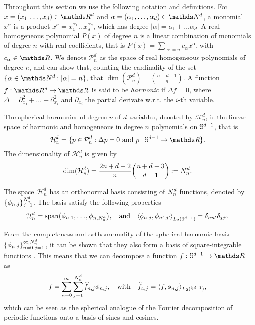 Throughout this section we use the following notation and definitions. For $x = (x_1, \ldots, x_d) \in \Reals^d$ and $\alpha = (\alpha_1, \ldots, \alpha_d) \in \Naturals^d$, a monomial $x^\alpha$ is a product $x^\alpha = x_1^{\alpha_1} \ldots x_d^{\alpha_d}$, which has degree $|\alpha| = \alpha_1 + \ldots \alpha_d$. A real homogeneous polynomial $P(x)$ of degree $n$ is a linear combination of monomials of degree $n$ with real coefficients, that is $P(x) = \sum_{|\alpha| = n} c_{\alpha} x^{\alpha}$, with $c_\alpha \in \Reals$. We denote $\mathcal{P}_n^d$ as the space of real homogeneous polynomials of degree $n$, and can show that, counting the cardinality of the set $\{\alpha \in \Naturals^d: |\alpha| = n\}$, that $\dim(\mathcal{P}_n^d) = \binom{n + d -1}{n}$. A function $f:\Reals^d \rightarrow \Reals$ is said to be \emph{harmonic} if $\Delta f = 0$, where $\Delta = \partial_{x_1}^2 + \ldots + \partial_{x_d}^2$ and $\partial_{x_i}$ the partial derivate w.r.t. the $i$-th variable.

\begin{definition}
    The spherical harmonics of degree $n$ of $d$ variables, denoted by $\mathcal{H}_{n}^d$, is the linear space of harmonic and homogeneous in degree $n$ polynomials on $\mathbb{S}^{d-1}$, that is 
    \begin{equation}
        \mathcal{H}_{n}^d = \{p \in \mathcal{P}_n^d: \Delta p = 0\ \text{and}\ p: \dsphere \rightarrow \Reals \}.
    \end{equation}
The dimensionality of $ \mathcal{H}_{n}^d$ is given by
\begin{equation}
\label{eq:numharmonics}
\textrm{dim}(\mathcal{H}_{n}^d) = \frac{2 n + d - 2}{n} \binom{n + d - 3}{d - 1} := N^d_n.
\end{equation}
\end{definition}

The space $\mathcal{H}_{n}^d$ has an orthonormal basis consisting of $N^d_n$ functions, denoted by $\{\phi_{n,j}\}_{j=1}^{N^d_n}$. The basis satisfy the following properties
\begin{equation}
    \mathcal{H}_{n}^d  = \textrm{span}\left(\phi_{n,1}, \ldots, \phi_{n, \dnumharmonicsforlevel}\right),\quad\text{and}\quad\left\langle \phi_{n, j}, \phi_{n', j'}\right\rangle_{L_2(\dsphere)} = \delta_{n n'} \delta_{j j'}.
\end{equation}

From the completeness and orthonormality of the spherical harmonic basis $\{\phi_{n,j}\}_{n=0,j=1}^{\infty,N^d_n}$, it can be shown that they also form a basis of square-integrable functions \citep{frye2014}. This means that we can decompose a function $f: \dsphere \rightarrow \Reals$ as
\begin{equation}
    f = \sum_{n=0}^{\infty} \sum_{j=1}^{N^d_n} \widehat{f}_{n, j} \phi_{n, j},\quad\text{with}\quad\widehat{f}_{n, j} = \langle f, \phi_{n, j} \rangle_{L_2(\mathbb{S}^{d-1})},
\end{equation}
which can be seen as the spherical analogue of the Fourier decomposition of periodic functions onto a basis of sines and cosines.

